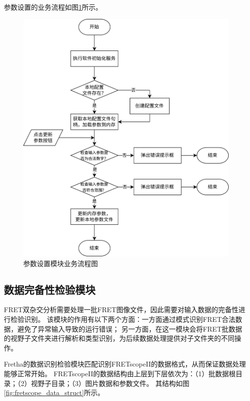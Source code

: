 参数设置的业务流程如图\ref{fig:fretha_param_module_flow}所示。

\begin{figure}[hbtp]
    \centering
    \includegraphics[height=1\linewidth]{../figures/2/2_成像参数设置模块业务流程.drawio.png}
    \caption{参数设置模块业务流程图}
    \label{fig:fretha_param_module_flow}
\end{figure}
\fi

\subsection{数据完备性检验模块}

FRET双杂交分析需要处理一批FRET图像文件，因此需要对输入数据的完备性进行检验识别。
该模块的作用有以下两个方面：一方面通过模式识别FRET合法数据，避免了异常输入导致的运行错误；
另一方面，在这一模块会将FRET批数据的视野子文件夹进行解析和类型识别，为后续数据处理提供对子文件夹的不同操作。

Fretha的数据识别检验模块匹配识别FRETscopeII的数据格式，从而保证数据处理能够正常开始。
FRETscopeII的数据结构由上层到下层依次为：（1）批数据根目录；（2）视野子目录；（3）图片数据和参数文件。
其结构如图\ref{fig:fretscope_data_struct}所示。

